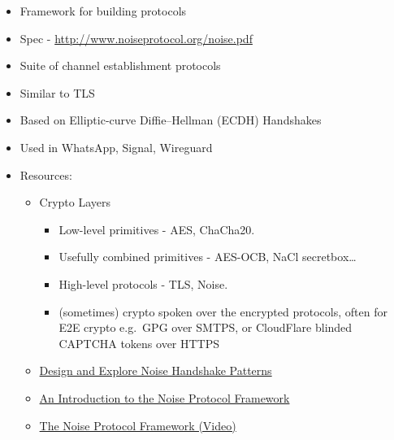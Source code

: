 \begin{itemize}
\tightlist
\item
  Framework for building protocols
\item
  Spec - \url{http://www.noiseprotocol.org/noise.pdf}
\item
  Suite of channel establishment protocols
\item
  Similar to TLS
\item
  Based on Elliptic-curve Diffie--Hellman (ECDH) Handshakes
\item
  Used in WhatsApp, Signal, Wireguard
\item
  Resources:

  \begin{itemize}
  \tightlist
  \item
    Crypto Layers

    \begin{itemize}
    \tightlist
    \item
      Low-level primitives - AES, ChaCha20.
    \item
      Usefully combined primitives - AES-OCB, NaCl secretbox\ldots{}
    \item
      High-level protocols - TLS, Noise.
    \item
      (sometimes) crypto spoken over the encrypted protocols, often for E2E crypto e.g.~GPG over SMTPS, or CloudFlare blinded CAPTCHA tokens over HTTPS
    \end{itemize}
  \item
    \href{https://noiseexplorer.com/}{Design and Explore Noise Handshake Patterns}
  \item
    \href{https://duo.com/labs/tech-notes/noise-protocol-framework-intro}{An Introduction to the Noise Protocol Framework}
  \item
    \href{https://www.youtube.com/watch?v=ceGTgqypwnQ}{The Noise Protocol Framework (Video)}
  \end{itemize}
\end{itemize}

